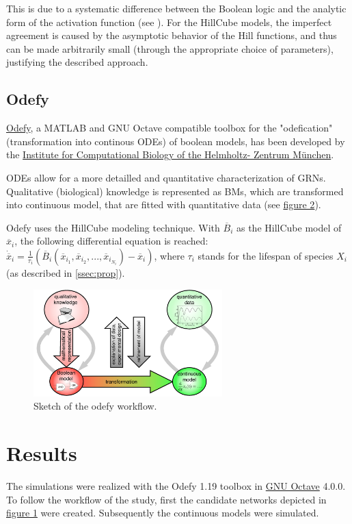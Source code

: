 \documentclass[11pt]{article}
\begin{document}
This is due to a systematic difference between the Boolean logic and the analytic form of the activation function (see \cite{Wittmann}). For the HillCube models, the imperfect agreement is caused by the asymptotic behavior of the Hill
functions, and thus can be made arbitrarily small (through the appropriate choice of parameters), justifying the described approach.

\subsection{Odefy}
\href{http://www.helmholtz-muenchen.de/icb/software/odefy/index.html}{Odefy}, a MATLAB and GNU Octave compatible toolbox for the "odefication" (transformation into continous ODEs) of boolean models, has been developed by the \href{http://www.helmholtz-muenchen.de/icb/index.html}{Institute for Computational Biology of the Helmholtz-
Zentrum M{\"u}nchen}.

ODEs allow for a more detailled and quantitative characterization of GRNs. Qualitative (biological) knowledge is represented as BMs, which are transformed into continuous model, that are fitted with quantitative data (see \hyperref[odefy_workflow]{figure 2}).

Odefy uses the HillCube modeling technique. With $\overline{B}_{i}$ as the HillCube model of $\overline{x}_{i}$, the following differential equation is reached: $\dot{\overline{x}}_{i} = \frac{1}{\tau_{i}} (\overline{B}_{i} (\overline{x}_{i_{1}}, \overline{x}_{i_{2}},..., \overline{x}_{i_{N_{i}}} ) - \overline{x}_{i} )$, where $\tau_{i}$ stands for the lifespan of species $X_{i}$ (as described in \ref{ssec:prop}).

\begin{figure}[hb]
  \centering
  \includegraphics[width=0.65\textwidth]{odefy.jpg}
  \caption{\label{odefy_workflow} Sketch of the odefy workflow.}
\end{figure}

\section{Results} \label{sec:Results}
The simulations were realized with the Odefy 1.19 toolbox in \href{https://www.gnu.org/software/octave/}{GNU Octave}
4.0.0. To follow the workflow of the study, first the candidate networks depicted in \hyperref[regulatory_network]{figure 1} were created. Subsequently the continuous models were simulated.
\end{document}
